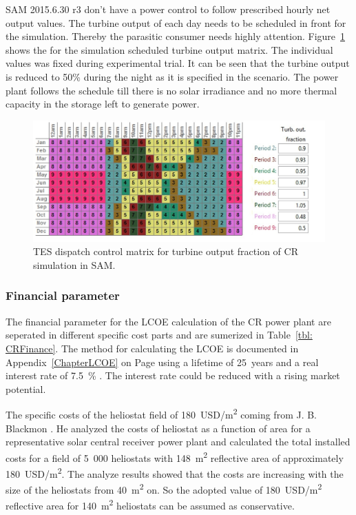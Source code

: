 SAM 2015.6.30 r3 don't have a power control to follow prescribed hourly net output values. The turbine output of each day needs to be scheduled in front for the simulation. Thereby the parasitic consumer needs highly attention. Figure~\ref{CR_turbineoutput} shows the for the simulation scheduled turbine output matrix. The individual values was fixed during experimental trial. It can be seen that the turbine output is reduced to 50\% during the night as it is specified in the scenario. The power plant follows the schedule till there is no solar irradiance and no more thermal capacity in the storage left to generate power. 
\begin{figure}[htbp]  
\centering
\includegraphics[width=0.95\linewidth]{FIG/CR_turbineoutput}
\caption[TES dispatch control matrix for turbine output fraction of CR simulation in SAM.]{TES dispatch control matrix for turbine output fraction of CR simulation in SAM.}\label{CR_turbineoutput}
\end{figure}
\pagebreak
\subsubsection{Financial parameter}
The financial parameter for the LCOE calculation of the CR power plant are seperated in different specific cost parts and are sumerized in Table~\ref{tbl: CRFinance}. The method for calculating the LCOE is documented in Appendix~\ref{ChapterLCOE} on Page \pageref{ChapterLCOE} using a lifetime of 25~years and a real interest rate of 7.5~\% \cite{FraunhoferISE2013}. The interest rate could be reduced with a rising market potential.



The specific costs of the heliostat field of 180~USD/m\textsuperscript{2} coming from J. B. Blackmon \cite{Blackmon2012}. He analyzed the costs of heliostat as a function of area for a representative solar central receiver power plant and calculated the total installed costs for a field of 5~000 heliostats with 148~m\textsuperscript{2} reflective area of approximately 180~USD/m\textsuperscript{2}. The analyze results showed that the costs are increasing with the size of the heliostats from 40~m\textsuperscript{2} on. So the adopted value of 180~USD/m\textsuperscript{2} reflective area for 140~m\textsuperscript{2} heliostats can be assumed as conservative.

